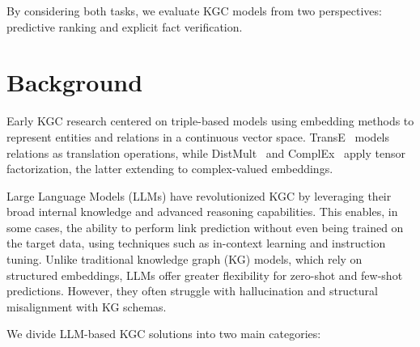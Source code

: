 \documentclass[12pt,a4paper]{article}
\begin{document}
By considering both tasks, we evaluate KGC models from two perspectives: predictive ranking and explicit fact verification.


%
%


\section{Background}\label{sec:background}

Early KGC research centered on triple-based models using embedding methods to represent entities and relations in a continuous vector space.
TransE~\cite{bordes2013translating} models relations as translation operations, while DistMult~\cite{yang2014embedding} and ComplEx~\cite{trouillon2016complex} apply tensor factorization, the latter extending to complex-valued embeddings.



Large Language Models (LLMs) have revolutionized KGC by leveraging their broad internal knowledge and advanced reasoning capabilities.
This enables, in some cases, the ability to perform link prediction without even being trained on the target data, using techniques such as in-context learning and instruction tuning.
Unlike traditional knowledge graph (KG) models, which rely on structured embeddings, LLMs offer greater flexibility for zero-shot and few-shot predictions.
However, they often struggle with hallucination and structural misalignment with KG schemas.


We divide LLM-based KGC solutions into two main categories:
\end{document}
